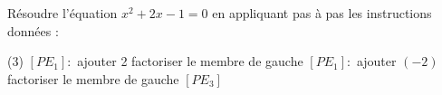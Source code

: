 \documentclass[a4paper,12pt]{report}
\begin{document}
\begin{exo}
 Résoudre l'équation $x^2+2 x-1=0$ en appliquant pas à pas les instructions données :
	\begin{tasks}(3)
\task $\left[P E_1\right]:$ ajouter 2
\task factoriser le membre de gauche
\task $\left[P E_1\right]:$ ajouter $(-2)$
\task factoriser le membre de gauche
\task $\left[P E_3\right]$
	\end{tasks}
\end{exo}
\end{document}
